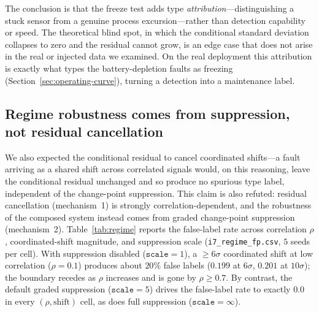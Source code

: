 The conclusion is that the freeze test adds type \emph{attribution}---distinguishing a stuck sensor from a genuine process excursion---rather than detection capability or speed. The theoretical blind spot, in which the conditional standard deviation collapses to zero and the residual cannot grow, is an edge case that does not arise in the real or injected data we examined. On the real deployment this attribution is exactly what types the battery-depletion faults as freezing (Section~\ref{sec:operating-curve}), turning a detection into a maintenance label.

\subsection{Regime robustness comes from suppression, not residual cancellation}
\label{sec:regime}
We also expected the conditional residual to cancel coordinated shifts---a fault arriving as a shared shift across correlated signals would, on this reasoning, leave the conditional residual unchanged and so produce no spurious type label, independent of the change-point suppression. This claim is also refuted: residual cancellation (mechanism~1) is strongly correlation-dependent, and the robustness of the composed system instead comes from graded change-point suppression (mechanism~2). Table~\ref{tab:regime} reports the false-label rate across correlation $\rho$, coordinated-shift magnitude, and suppression scale (\texttt{i7\_regime\_fp.csv}, $5$ seeds per cell). With suppression disabled ($\texttt{scale}=1$), a $\geq 6\sigma$ coordinated shift at low correlation ($\rho=0.1$) produces about $20\%$ false labels ($0.199$ at $6\sigma$, $0.201$ at $10\sigma$); the boundary recedes as $\rho$ increases and is gone by $\rho \geq 0.7$. By contrast, the default graded suppression ($\texttt{scale}=5$) drives the false-label rate to exactly $0.0$ in every $(\rho, \text{shift})$ cell, as does full suppression ($\texttt{scale}=\infty$).

